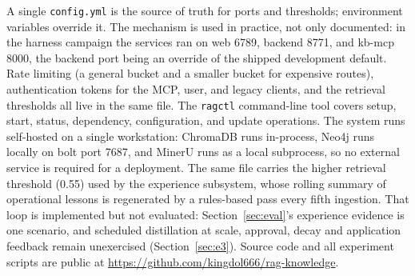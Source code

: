 A single \texttt{config.yml} is the source of truth for ports and
thresholds; environment variables override it. The mechanism is used in
practice, not only documented: in the harness campaign the services ran on
web 6789, backend 8771, and kb-mcp 8000, the backend port being an override
of the shipped development default. Rate limiting (a general bucket and a
smaller bucket for expensive routes), authentication tokens for the MCP,
user, and legacy clients, and the retrieval thresholds all live in the same
file. The \texttt{ragctl} command-line tool covers setup, start, status,
dependency, configuration, and update operations. The system runs
self-hosted on a single workstation: ChromaDB runs in-process, Neo4j runs
locally on bolt port 7687, and MinerU runs as a local subprocess, so no
external service is required for a deployment. The same file carries the
higher retrieval threshold (0.55) used by the experience subsystem, whose
rolling summary of operational lessons is regenerated by a rules-based pass
every fifth ingestion. That loop is implemented but not evaluated:
Section~\ref{sec:eval}'s experience evidence is one scenario, and scheduled
distillation at scale, approval, decay and application feedback remain
unexercised (Section~\ref{sec:e3}). Source code and all experiment scripts are public at
\url{https://github.com/kingdol666/rag-knowledge}.

